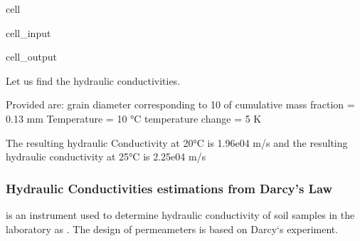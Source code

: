 \documentclass[letterpaper,10pt,english]{jupyterBook}
\begin{document}
\begin{sphinxuseclass}{cell}
\begin{sphinxVerbatimInput}
\begin{sphinxuseclass}{cell_input}
\begin{sphinxVerbatim}[commandchars=\\\{\}]
  
\end{sphinxVerbatim}

\end{sphinxuseclass}\end{sphinxVerbatimInput}
\begin{sphinxVerbatimOutput}

\begin{sphinxuseclass}{cell_output}
\begin{sphinxVerbatim}[commandchars=\\\{\}]
Let us find the hydraulic conductivities.

Provided are:
grain diameter corresponding to 10\PYGZpc{} of cumulative mass fraction = 0.13 mm
Temperature = 10 °C
temperature change = 5 K 

The resulting hydraulic Conductivity at 20°C is 1.96e\PYGZhy{}04 m/s 
and the resulting hydraulic conductivity at 25°C is 2.25e\PYGZhy{}04 m/s
\end{sphinxVerbatim}

\end{sphinxuseclass}\end{sphinxVerbatimOutput}

\end{sphinxuseclass}

\subsubsection{Hydraulic Conductivities estimations from Darcy’s Law}
\label{\detokenize{content/flow/L4/14_darcy_law_K:hydraulic-conductivities-estimations-from-darcy-s-law}}
\sphinxAtStartPar
{} is an instrument used to determine hydraulic conductivity of soil samples
in the laboratory as . The design of permeameters is based on Darcy‘s
experiment.
\end{document}
